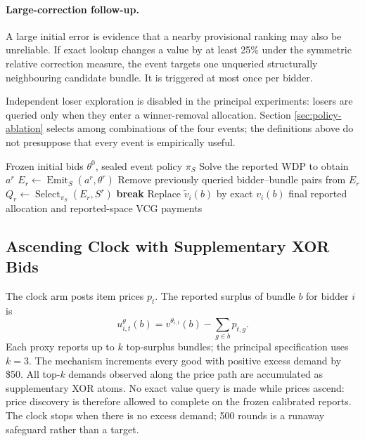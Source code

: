 \paragraph{Large-correction follow-up.}
A large initial error is evidence that a nearby provisional ranking may also
be unreliable. If exact lookup changes a value by at least 25\% under the
symmetric relative correction measure, the event targets one unqueried
structurally neighbouring candidate bundle. It is triggered at most once per
bidder.

Independent loser exploration is disabled in the principal experiments:
losers are queried only when they enter a winner-removal allocation. Section
\ref{sec:policy-ablation} selects among combinations of the four events; the
definitions above do not presuppose that every event is empirically useful.

\begin{algorithm}[htbp]
\caption{Iterative sealed elicitation}
\label{alg:sealed}
\begin{algorithmic}[1]
\Require Frozen initial bids \(\theta^0\), sealed event policy \(\pi_S\)
    \State Solve the reported WDP to obtain \(a^r\)
    \State \(E_r\gets\operatorname{Emit}_{S}(a^r,\theta^r)\)
    \State Remove previously queried bidder--bundle pairs from \(E_r\)
    \State \(Q_r\gets\operatorname{Select}_{\pi_S}(E_r,S^r)\)
     \State \textbf{break} \EndIf
     \State Replace \(\tilde v_i(b)\) by exact \(v_i(b)\) \EndFor
\EndFor
\State \Return final reported allocation and reported-space VCG payments
\end{algorithmic}
\end{algorithm}

\subsection{Ascending Clock with Supplementary XOR Bids}

The clock arm posts item prices \(p_t\). The reported surplus of bundle \(b\) for bidder \(i\) is
\[
u_{i,t}^{\theta}(b)=v^{\theta_{i,t}}(b)-\sum_{g\in b}p_{t,g}.
\]
Each proxy reports up to \(k\) top-surplus bundles; the principal
specification uses \(k=3\). The mechanism increments every good with positive
excess demand by \$50. All top-\(k\) demands observed along the price path are
accumulated as supplementary XOR atoms. No exact value query is made while
prices ascend: price discovery is therefore allowed to complete on the
frozen calibrated reports. The clock stops when there is no excess demand;
500 rounds is a runaway safeguard rather than a target.

